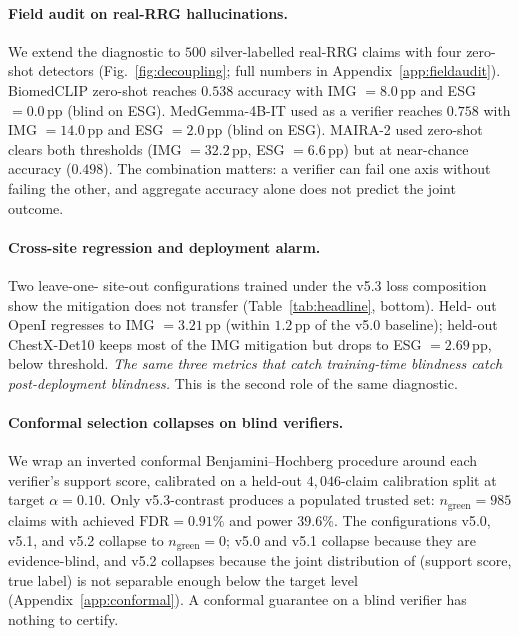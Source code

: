 \documentclass{article}
\begin{document}
\paragraph{Field audit on real-RRG hallucinations.} We extend the
diagnostic to $500$ silver-labelled real-RRG claims with four zero-shot
detectors (Fig.~\ref{fig:decoupling}; full numbers in
Appendix~\ref{app:fieldaudit}). BiomedCLIP zero-shot reaches $0.538$
accuracy with IMG $= 8.0$\,pp and ESG $= 0.0$\,pp (blind on ESG).
MedGemma-4B-IT used as a verifier reaches $0.758$ with IMG $= 14.0$\,pp
and ESG $= 2.0$\,pp (blind on ESG). MAIRA-2 used zero-shot clears both
thresholds (IMG $= 32.2$\,pp, ESG $= 6.6$\,pp) but at near-chance
accuracy ($0.498$). The combination matters: a verifier can fail one
axis without failing the other, and aggregate accuracy alone does not
predict the joint outcome.

\paragraph{Cross-site regression and deployment alarm.} Two leave-one-
site-out configurations trained under the v5.3 loss composition show the
mitigation does not transfer (Table~\ref{tab:headline}, bottom). Held-
out OpenI regresses to IMG $= 3.21$\,pp (within $1.2$\,pp of the v5.0
baseline); held-out ChestX-Det10 keeps most of the IMG mitigation but
drops to ESG $= 2.69$\,pp, below threshold. \emph{The same three metrics
that catch training-time blindness catch post-deployment blindness.}
This is the second role of the same diagnostic.

\paragraph{Conformal selection collapses on blind verifiers.} We wrap an
inverted conformal Benjamini--Hochberg procedure around each verifier's
support score, calibrated on a held-out $4{,}046$-claim calibration
split at target $\alpha = 0.10$. Only v5.3-contrast produces a populated
trusted set: $n_{\mathrm{green}} = 985$ claims with achieved
$\mathrm{FDR} = 0.91\%$ and power $39.6\%$. The configurations v5.0,
v5.1, and v5.2 collapse to $n_{\mathrm{green}} = 0$; v5.0 and v5.1
collapse because they are evidence-blind, and v5.2 collapses because the
joint distribution of (support score, true label) is not separable
enough below the target level (Appendix~\ref{app:conformal}). A
conformal guarantee on a blind verifier has nothing to certify.
\end{document}

